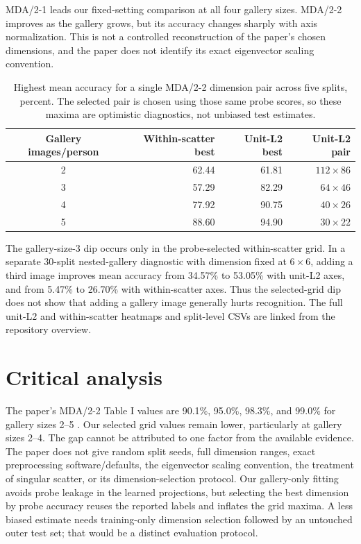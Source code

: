 \documentclass[10pt]{article}
\begin{document}
MDA/2-1 leads our fixed-setting comparison at all four gallery sizes. MDA/2-2 improves as the gallery grows, but its accuracy changes sharply with axis normalization. This is not a controlled reconstruction of the paper's chosen dimensions, and the paper does not identify its exact eigenvector scaling convention.

\begin{table}[h]
\centering
\small
\caption{Highest mean accuracy for a single MDA/2-2 dimension pair across five splits, percent. The selected pair is chosen using those same probe scores, so these maxima are optimistic diagnostics, not unbiased test estimates.}
\begin{tabular}{crrr}
\toprule
Gallery images/person & Within-scatter best & Unit-L2 best & Unit-L2 pair\\
\midrule
2 & 62.44 & 61.81 & $112\times86$\\
3 & 57.29 & 82.29 & $64\times46$\\
4 & 77.92 & 90.75 & $40\times26$\\
5 & 88.60 & 94.90 & $30\times22$\\
\bottomrule
\end{tabular}
\end{table}

The gallery-size-3 dip occurs only in the probe-selected within-scatter grid. In a separate 30-split nested-gallery diagnostic with dimension fixed at $6\times6$, adding a third image improves mean accuracy from 34.57\% to 53.05\% with unit-L2 axes, and from 5.47\% to 26.70\% with within-scatter axes. Thus the selected-grid dip does not show that adding a gallery image generally hurts recognition. The full unit-L2 and within-scatter heatmaps and split-level CSVs are linked from the repository overview.

\section{Critical analysis}
The paper's MDA/2-2 Table I values are 90.1\%, 95.0\%, 98.3\%, and 99.0\% for gallery sizes 2--5 \citep{Yan2007MDA}. Our selected grid values remain lower, particularly at gallery sizes 2--4. The gap cannot be attributed to one factor from the available evidence. The paper does not give random split seeds, full dimension ranges, exact preprocessing software/defaults, the eigenvector scaling convention, the treatment of singular scatter, or its dimension-selection protocol. Our gallery-only fitting avoids probe leakage in the learned projections, but selecting the best dimension by probe accuracy reuses the reported labels and inflates the grid maxima. A less biased estimate needs training-only dimension selection followed by an untouched outer test set; that would be a distinct evaluation protocol.
\end{document}
